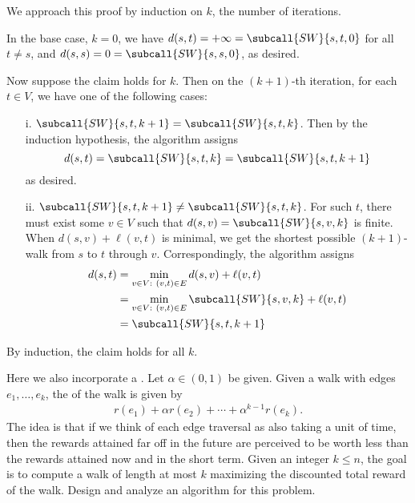 \documentclass{article}
\begin{document}
\begin{solution}
\begin{subproof}[Correctness.]
We approach this proof by induction on \( k \), the number of iterations.

In the base case, \( k=0 \), we have \( d(s,t) = +\infty = \subcall{SW}{s,t,0} \) for all \( t \not= s \), and \( d(s,s) = 0 = \subcall{SW}{s,s,0} \), as desired.

Now suppose the claim holds for \( k \). Then on the \( (k+1) \)-th iteration, for each \( t \in V \), we have one of the following cases:
\begin{enumerate}
    \item [i.] \( \subcall{SW}{s,t,k+1} = \subcall{SW}{s,t,k} \). Then by the induction hypothesis, the algorithm assigns \[d(s,t)= \subcall{SW}{s,t,k} = \subcall{SW}{s,t,k+1}\]as desired.

    \item [ii.] \( \subcall{SW}{s,t,k+1} \not= \subcall{SW}{s,t,k} \).
    For such \( t \), there must exist some \( v \in V \) such that \( d(s,v)=\subcall{SW}{s,v,k} \) is finite. When \( d(s,v) + \ell(v,t) \) is minimal, we get the shortest possible \( (k+1) \)-walk from \( s \) to \( t \) through \( v \).
    Correspondingly, the algorithm assigns
    \begin{align*}
        d(s,t)
        &= \min_{v \in V: \ (v,t) \in E} d(s,v) + \ell(v,t) \\
        &= \min_{v \in V: \ (v,t) \in E} \subcall{SW}{s,v,k} + \ell(v,t) \\
        &= \subcall{SW}{s,t,k+1}
    \end{align*}
\end{enumerate}
By induction, the claim holds for all \( k \).
\end{subproof}
\end{solution}

\pagebreak


\begin{subexercise}
  Here we also incorporate a .
  Let \( \alpha\in (0,1) \) be given.
  Given a walk with edges \( e_1,\ldots, e_k \), the  of the walk is given by
  \begin{align*}
    r(e_1)+\alpha r(e_2) + \cdots + \alpha^{k-1}r(e_k).
  \end{align*}
  The idea is that if we think of each edge traversal as also taking a unit of time, then the rewards attained far off in the future are perceived to be worth less than the rewards attained now and in the short term.
  Given an integer \( k \leq n \), the goal is to compute a walk of length at most \( k \) maximizing the discounted total reward of the walk.
  Design and analyze an algorithm for this problem.
\end{subexercise}
\end{document}
